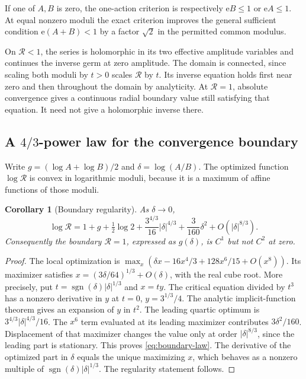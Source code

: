 \documentclass[11pt,a4paper]{article}
\numberwithin{equation}{section}
\newtheorem{corollary}[theorem]{Corollary}
\theoremstyle{definition}
\theoremstyle{remark}
\newcommand{\e}{\mathrm e}
\begin{document}
If one of $A,B$ is zero, the one-action criterion is respectively
$\e B\le1$ or $\e A\le1$. At equal nonzero moduli the exact criterion
improves the general sufficient condition $\e(A+B)<1$ by a factor
$\sqrt2$ in the permitted common modulus.

On $\mathcal R<1$, the series is holomorphic in its two effective
amplitude variables and continues the inverse germ at zero amplitude.
The domain is connected, since scaling both moduli by $t>0$ scales
$\mathcal R$ by $t$. Its inverse equation holds first near zero and
then throughout the domain by analyticity. At $\mathcal R=1$, absolute
convergence gives a continuous radial boundary value still satisfying
that equation. It need not give a holomorphic inverse there.

\subsection{A \texorpdfstring{$4/3$}{4/3}-power law for the convergence boundary}

Write $g=(\log A+\log B)/2$ and $\delta=\log(A/B)$. The optimized
function $\log\mathcal R$ is convex in logarithmic moduli, because it
is a maximum of affine functions of those moduli.

\begin{corollary}[Boundary regularity]\label{cor:boundary-law}
As $\delta\to0$,
\begin{equation}\label{eq:boundary-law}
 \log\mathcal R=1+g+\tfrac12\log2
 +\frac{3^{4/3}}{16}|\delta|^{4/3}
 +\frac3{160}\delta^2+O(|\delta|^{8/3}).
\end{equation}
Consequently the boundary $\mathcal R=1$, expressed as $g(\delta)$,
is $C^1$ but not $C^2$ at zero.
\end{corollary}

\begin{proof}
The local optimization is
$\max_x(\delta x-16x^4/3+128x^6/15+O(x^8))$.
Its maximizer satisfies $x=(3\delta/64)^{1/3}+O(\delta)$, with the
real cube root. More precisely, put
$t=\operatorname{sgn}(\delta)|\delta|^{1/3}$ and $x=ty$. The critical
equation divided by $t^3$ has a nonzero derivative in $y$ at
$t=0$, $y=3^{1/3}/4$. The analytic implicit-function theorem gives
an expansion of $y$ in $t^2$. The leading quartic optimum is
$3^{4/3}|\delta|^{4/3}/16$. The $x^6$ term evaluated at its leading
maximizer contributes $3\delta^2/160$. Displacement of that maximizer
changes the value only at order $|\delta|^{8/3}$, since the leading
part is stationary. This proves \eqref{eq:boundary-law}.
The derivative of the optimized part in $\delta$ equals the unique
maximizing $x$, which behaves as a nonzero multiple of
$\operatorname{sgn}(\delta)|\delta|^{1/3}$. The regularity statement follows.
\end{proof}
\end{document}
